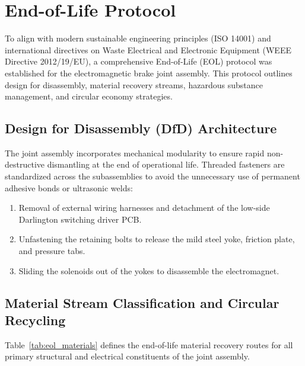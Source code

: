 \chapter{End-of-Life Protocol}
\label{ch:eol_protocol}

To align with modern sustainable engineering principles (ISO 14001) and international directives on Waste Electrical and Electronic Equipment (WEEE Directive 2012/19/EU), a comprehensive End-of-Life (EOL) protocol was established for the electromagnetic brake joint assembly. This protocol outlines design for disassembly, material recovery streams, hazardous substance management, and circular economy strategies.

\section{Design for Disassembly (DfD) Architecture}
The joint assembly incorporates mechanical modularity to ensure rapid non-destructive dismantling at the end of operational life. Threaded fasteners are standardized across the subassemblies to avoid the unnecessary use of permanent adhesive bonds or ultrasonic welds:
\begin{enumerate}[leftmargin=*]
	\item Removal of external wiring harnesses and detachment of the low-side Darlington switching driver PCB.
	\item Unfastening the retaining bolts to release the mild steel yoke, friction plate, and pressure tabs.
	\item Sliding the solenoids out of the yokes to disassemble the electromagnet.
\end{enumerate}

\section{Material Stream Classification and Circular Recycling}
Table~\ref{tab:eol_materials} defines the end-of-life material recovery routes for all primary structural and electrical constituents of the joint assembly.

